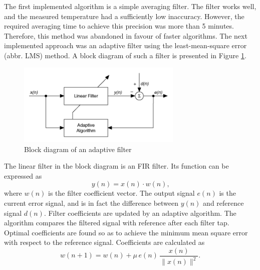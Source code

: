 \documentclass{standalone}
\begin{document}
The first implemented algorithm is a simple averaging filter. The filter works well, and the measured temperature had a sufficiently low inaccuracy. However, the required averaging time to achieve this precision was more than 5 minutes. Therefore, this method was abandoned in favour of faster algorithms. The next implemented approach was an adaptive filter using the least-mean-square error (abbr. LMS) method. A block diagram of such a filter is presented in Figure \ref{fig:lms_block}.
\begin{figure}[h]
	\centering
	\includegraphics[width=0.7\textwidth]{lms_block.png}
	\caption{Block diagram of an adaptive filter \cite{labview:filter}}
	\label{fig:lms_block}
\end{figure}
The linear filter in the block diagram is an FIR filter. Its function can be expressed as \cite{anc}\cite{mitlecture25}
\begin{equation}
y(n) = x(n) \cdot w(n) \textrm{,}
\end{equation}
where $w(n)$ is the filter coefficient vector. The output signal $e(n)$ is the current error signal, and is in fact the difference between $y(n)$ and reference signal $d(n)$. Filter coefficients are updated by an adaptive algorithm. The algorithm compares the filtered signal with reference after each filter tap. Optimal coefficients are found so as to achieve the minimum mean square error with respect to the reference signal. Coefficients are calculated as
\begin{equation} \label{eq:normalizedlms}
w(n+1) = w(n) + \mu \, e(n) \, \frac{x(n)}{\| x(n) \| ^2} \textrm{.}
\end{equation}
\end{document}
